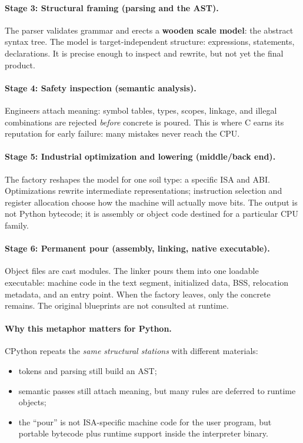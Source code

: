 \documentclass[a4paper,twoside]{report}
\begin{document}
\paragraph{Stage 3: Structural framing (parsing and the AST).}
The parser validates grammar and erects a \textbf{wooden scale model}: the abstract syntax tree. The model is target-independent structure: expressions, statements, declarations. It is precise enough to inspect and rewrite, but not yet the final product.

\paragraph{Stage 4: Safety inspection (semantic analysis).}
Engineers attach meaning: symbol tables, types, scopes, linkage, and illegal combinations are rejected \emph{before} concrete is poured. This is where C earns its reputation for early failure: many mistakes never reach the CPU.

\paragraph{Stage 5: Industrial optimization and lowering (middle/back end).}
The factory reshapes the model for one soil type: a specific ISA and ABI. Optimizations rewrite intermediate representations; instruction selection and register allocation choose how the machine will actually move bits. The output is not Python bytecode; it is assembly or object code destined for a particular CPU family.

\paragraph{Stage 6: Permanent pour (assembly, linking, native executable).}
Object files are cast modules. The linker pours them into one loadable executable: machine code in the text segment, initialized data, BSS, relocation metadata, and an entry point. When the factory leaves, only the concrete remains. The original blueprints are not consulted at runtime.

\paragraph{Why this metaphor matters for Python.}
CPython repeats the \emph{same structural stations} with different materials:
\begin{itemize}
    \item tokens and parsing still build an AST;
    \item semantic passes still attach meaning, but many rules are deferred to runtime objects;
    \item the ``pour'' is not ISA-specific machine code for the user program, but portable bytecode plus runtime support inside the interpreter binary.
\end{itemize}
\end{document}
